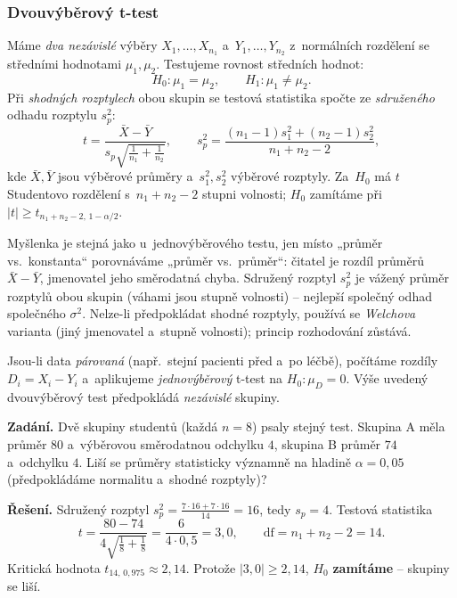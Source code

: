 \subsubsection*{Dvouvýběrový t-test}

\begin{definice}
Máme \emph{dva nezávislé} výběry $X_1,\dots,X_{n_1}$ a~$Y_1,\dots,Y_{n_2}$ z~normálních rozdělení se středními hodnotami $\mu_1,\mu_2$. Testujeme rovnost středních hodnot:
\[ H_0\colon \mu_1=\mu_2,\qquad H_1\colon \mu_1\neq\mu_2. \]
Při \emph{shodných rozptylech} obou skupin se testová statistika spočte ze \emph{sdruženého} odhadu rozptylu $s_p^2$:
\[ t=\frac{\bar X-\bar Y}{s_p\sqrt{\tfrac{1}{n_1}+\tfrac{1}{n_2}}},\qquad
   s_p^2=\frac{(n_1-1)s_1^2+(n_2-1)s_2^2}{n_1+n_2-2}, \]
kde $\bar X,\bar Y$ jsou výběrové průměry a~$s_1^2,s_2^2$ výběrové rozptyly. Za~$H_0$ má $t$ Studentovo rozdělení s~$n_1+n_2-2$ stupni volnosti; $H_0$ zamítáme při $|t|\ge t_{n_1+n_2-2,\,1-\alpha/2}$.
\end{definice}

\begin{intuice}
Myšlenka je stejná jako u~jednovýběrového testu, jen místo „průměr vs.\ konstanta`` porovnáváme „průměr vs.\ průměr``: čitatel je rozdíl průměrů $\bar X-\bar Y$, jmenovatel jeho směrodatná chyba. Sdružený rozptyl $s_p^2$ je vážený průměr rozptylů obou skupin (váhami jsou stupně volnosti) -- nejlepší společný odhad společného $\sigma^2$. Nelze-li předpokládat shodné rozptyly, používá se \emph{Welchova} varianta (jiný jmenovatel a~stupně volnosti); princip rozhodování zůstává.
\end{intuice}

\begin{poznamka}
Jsou-li data \emph{párovaná} (např.\ stejní pacienti před a~po léčbě), počítáme rozdíly $D_i=X_i-Y_i$ a~aplikujeme \emph{jednovýběrový} t-test na $H_0\colon \mu_D=0$. Výše uvedený dvouvýběrový test předpokládá \emph{nezávislé} skupiny.
\end{poznamka}

\begin{priklad}
\textbf{Zadání.} Dvě skupiny studentů (každá $n=8$) psaly stejný test. Skupina A měla průměr $80$ a~výběrovou směrodatnou odchylku $4$, skupina B průměr $74$ a~odchylku $4$. Liší se průměry statisticky významně na hladině $\alpha=0{,}05$ (předpokládáme normalitu a~shodné rozptyly)?

\smallskip
\textbf{Řešení.} Sdružený rozptyl $s_p^2=\frac{7\cdot 16+7\cdot 16}{14}=16$, tedy $s_p=4$. Testová statistika
\[ t=\frac{80-74}{4\sqrt{\tfrac18+\tfrac18}}=\frac{6}{4\cdot 0{,}5}=\boxed{3{,}0},\qquad \text{df}=n_1+n_2-2=14. \]
Kritická hodnota $t_{14,\,0{,}975}\approx 2{,}14$. Protože $|3{,}0|\ge 2{,}14$, $H_0$ \textbf{zamítáme} -- skupiny se liší.
\end{priklad}

